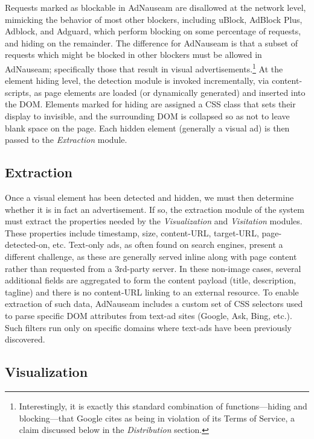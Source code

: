 \documentclass[conference]{IEEEtran}
\begin{document}
Requests marked as blockable in AdNauseam are disallowed at the network level, mimicking the behavior of most other blockers, including uBlock, AdBlock Plus, Adblock, and Adguard, which perform blocking on some percentage of requests, and hiding on the remainder. The difference for AdNauseam is that a subset of requests which might be blocked in other blockers must be allowed in AdNauseam; specifically those that result in visual advertisements.\footnote{Interestingly, it is exactly this standard combination of functions---hiding and blocking---that Google cites as being in violation of its Terms of Service, a claim discussed below in the \emph{Distribution} section.} At the element hiding level, the detection module is invoked incrementally, via content-scripts, as page elements are loaded (or dynamically generated) and inserted into the DOM. Elements marked for hiding are assigned a CSS class that sets their display to invisible, and the surrounding DOM is collapsed so as not to leave blank space on the page. Each hidden element (generally a visual ad) is then passed to the \emph{Extraction} module.


\subsection{Extraction}

Once a visual element has been detected and hidden, we must then determine whether it is in fact an advertisement. If so, the extraction module of the system must extract the properties needed by the \emph{Visualization} and \emph{Visitation} modules. These properties include timestamp, size, content-URL, target-URL, page-detected-on, etc. Text-only ads, as often found on search engines, present a different challenge, as these are generally served inline along with page content rather than requested from a 3rd-party server. In these non-image cases, several additional fields are aggregated to form the content payload (title, description, tagline) and there is no content-URL linking to an external resource. To enable extraction of such data, AdNauseam includes a custom set of CSS selectors used to parse specific DOM attributes from text-ad sites (Google, Ask, Bing, etc.). Such filters run only on specific domains where text-ads have been previously discovered.


\subsection{Visualization}
\end{document}
